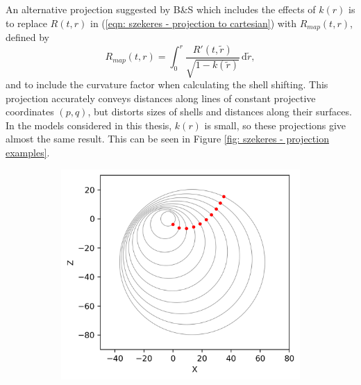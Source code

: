 \documentclass[a4paper,12pt]{report}
\newcommand{\diff}[1]{\,\text{d}{#1}}
\begin{document}
An alternative projection suggested by B\&S which includes the effects of $k(r)$ is to replace $R(t,r)$ in (\ref{eqn: szekeres - projection to cartesian}) with $R_{map}(t,r)$, defined by
\begin{equation}
  R_{map}(t,r) = \int_0^r \frac{R'(t,\tilde{r})}{\sqrt{1-k(\tilde{r})}}\diff{\tilde{r}},
\end{equation}
and to include the curvature factor when calculating the shell shifting. This projection accurately conveys distances along lines of constant projective coordinates $(p,q)$, but distorts sizes of shells and distances along their surfaces. In the models considered in this thesis, $k(r)$ is small, so these projections give almost the same result. This can be seen in Figure \ref{fig: szekeres - projection examples}.
\begin{figure}[!tbh]
     \centering
     \begin{subfigure}[b]{0.45\textwidth}
         \centering
         \includegraphics[width=\textwidth]{example plot no curvature.png}
     \end{subfigure}
     \hfill
     \begin{subfigure}[b]{0.45\textwidth}
         \centering

\end{subfigure}
\end{figure}
\end{document}
